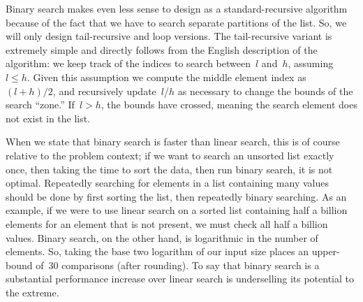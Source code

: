Binary search makes even less sense to design as a standard-recursive algorithm because of the fact that we have to search separate partitions of the list. 
So, we will only design tail-recursive and loop versions. 
The tail-recursive variant is extremely simple and directly follows from the English description of the algorithm: we keep track of the indices to search between~$l$ and~$h$, assuming~$l \leq h$. 
Given this assumption we compute the middle element index as~$(l + h) / 2$, and recursively update~$l$/$h$ as necessary to change the bounds of the search ``zone.'' 
If~$l > h$, the bounds have crossed, meaning the search element does not exist in the list. 

When we state that binary search is faster than linear search, this is of course relative to the problem context; if we want to search an unsorted list exactly once, then taking the time to sort the data, then run binary search, it is not optimal. 
Repeatedly searching for elements in a list containing many values should be done by first sorting the list, then repeatedly binary searching. 
As an example, if we were to use linear search on a sorted list containing half a billion elements for an element that is not present, we must check all half a billion values. 
Binary search, on the other hand, is logarithmic in the number of elements. 
So, taking the base two logarithm of our input size places an upper-bound of~$30$ comparisons (after rounding). 
To say that binary search is a substantial performance increase over linear search is underselling its potential to the extreme.

